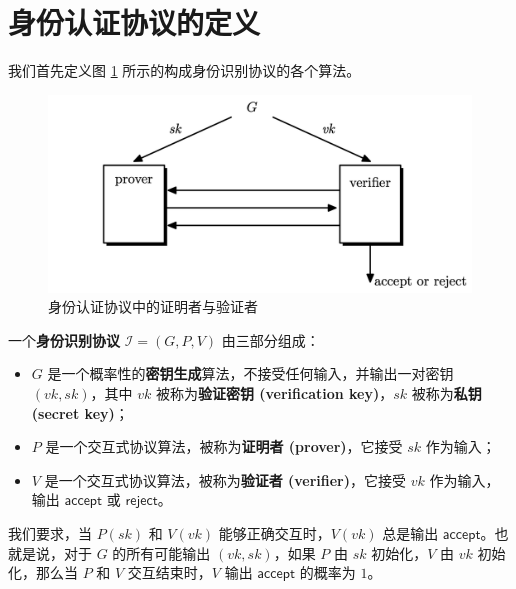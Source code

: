 \section{身份认证协议的定义}


我们首先定义图 \ref{fig:18—1} 所示的构成身份识别协议的各个算法。

\begin{figure}
    \centering
    \includegraphics[width=0.6\linewidth]{figures/chapter18/fig1.png}
    \caption{身份认证协议中的证明者与验证者}
    \label{fig:18—1}
\end{figure}

\begin{definition}
一个\textbf{身份识别协议} $\mathcal{I}=(G,P,V)$ 由三部分组成：
\begin{itemize}
    \item $G$ 是一个概率性的\textbf{密钥生成}算法，不接受任何输入，并输出一对密钥 $(vk,sk)$，其中 $vk$ 被称为\textbf{验证密钥 (verification key)}，$sk$ 被称为\textbf{私钥 (secret key)}；
    \item $P$ 是一个交互式协议算法，被称为\textbf{证明者 (prover)}，它接受 $sk$ 作为输入；
    \item $V$ 是一个交互式协议算法，被称为\textbf{验证者 (verifier)}，它接受 $vk$ 作为输入，输出 $\mathsf{accept}$ 或 $\mathsf{reject}$。
\end{itemize}
我们要求，当 $P(sk)$ 和 $V(vk)$ 能够正确交互时，$V(vk)$ 总是输出 $\mathsf{accept}$。也就是说，对于 $G$ 的所有可能输出 $(vk,sk)$，如果 $P$ 由 $sk$ 初始化，$V$ 由 $vk$ 初始化，那么当 $P$ 和 $V$ 交互结束时，$V$ 输出 $\mathsf{accept}$ 的概率为 $1$。

\end{definition}